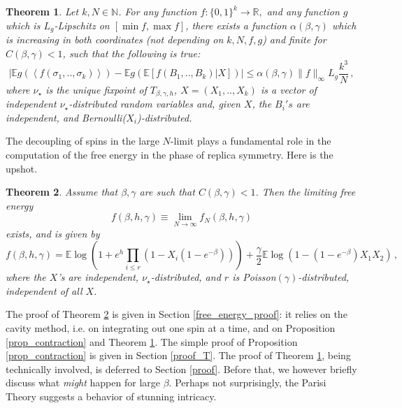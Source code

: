 \documentclass[a4paper,12pt,oneside,reqno]{amsart}
\numberwithin{equation}{section}
\newtheorem{teor}{Theorem}
\begin{document}
\begin{teor} \label{full_ind} Let $k,N \in {\mathbb{N}}$. For any function $f: \{0,1\}^k \rightarrow {\mathbb{R}},$  and any function $g$ which is $L_g$-Lipschitz on $\left[\min f, \max f \right]$, there exists a function  $\alpha({\beta}, \gamma)$ which is increasing in both coordinates (not depending on $k, N, f,g$) and finite for $C({\beta}, \gamma) < 1$, such that the following is true: 
\[
\left|{{\mathbb{E}}} g\left(\left<f\left(\sigma_1,..,\sigma_k\right)\right>\right) - {{\mathbb{E}}} g\left({{\mathbb{E}}}\left[f\left(B_1,..,B_k\right) | X\right]\right) \right|\leq \alpha(\beta,\gamma) \| f \|_\infty L_g \frac{k^3}{N} \,,
\]
where $\nu_\star$ is the unique fixpoint of $T_{{\beta}, \gamma, h}$, $X= (X_1,..,X_k)$ is a vector of independent $\nu_\star$-distributed random variables and, given $X$, the $B_i's$ are independent, and Bernoulli($X_i$)-distributed.

\end{teor}

The decoupling of spins in the large $N$-limit plays a fundamental role in the computation of the free energy in the phase of replica symmetry. Here is the upshot.

\begin{teor} \label{free_energy}
Assume that ${\beta}, \gamma$ are such that $C({\beta}, \gamma) < 1$. Then the limiting free energy 
\[
f({\beta}, h, \gamma) {\equiv} \lim_{N\to \infty} f_N({\beta}, h, \gamma)
\]
exists, and is given by 
\[
f({\beta}, h, \gamma) = {{\mathbb{E}}} \log\left( 1+ e^h \prod_{i\leq r} \left(1- X_i \left( 1-e^{-{\beta}}\right) \right) \right)
+ \frac{\gamma}{2} {{\mathbb{E}}} \log\left(1-  \left( 1-e^{-{\beta}} \right) X_1 X_2 \right)\,,
\]
where the $X$'s are independent, $\nu_\star$-distributed, and $r$ is Poisson$(\gamma)$-distributed, independent of all $X$.
\end{teor}

The proof of Theorem \ref{free_energy} is given in Section \ref{free_energy_proof}: it relies on the cavity method, i.e. on integrating out one spin at a time, and on Proposition \ref{prop_contraction} and Theorem \ref{full_ind}. The simple proof of  Proposition \ref{prop_contraction}  is given 
in Section \ref{proof_T}. The proof of Theorem \ref{full_ind}, being technically involved, is deferred to Section \ref{proof}. 
Before that, we however briefly discuss what {\it might} happen for large ${\beta}$. Perhaps not surprisingly, the Parisi Theory \cite{giogio} suggests a behavior of stunning intricacy. 
\end{document}
